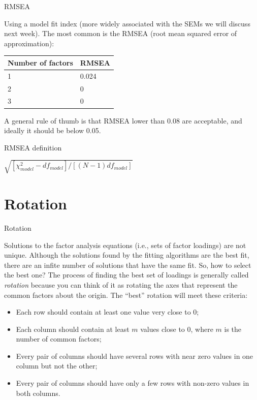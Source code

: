 \documentclass[10pt,ignorenonframetext,]{beamer}
\providecommand{\tightlist}{%
\setlength{\itemsep}{0pt}\setlength{\parskip}{0pt}}
\begin{document}
\begin{frame}{RMSEA}

Using a model fit index (more widely associated with the SEMs we will
discuss next week). The most common is the RMSEA (root mean squared
error of approximation):

\begin{longtable}[]{@{}ll@{}}
\toprule
Number of factors & RMSEA\tabularnewline
\midrule
\endhead
1 & 0.024\tabularnewline
2 & 0\tabularnewline
3 & 0\tabularnewline
\bottomrule
\end{longtable}

A general rule of thumb is that RMSEA lower than 0.08 are acceptable,
and ideally it should be below 0.05.

\begin{block}{RMSEA definition}

\(\sqrt{[\chi^2_{model} - df_{model}]/[(N - 1) df_{model}]}\)

\end{block}

\end{frame}

\section{Rotation}\label{rotation}

\begin{frame}{Rotation}

Solutions to the factor analysis equations (i.e., sets of factor
loadings) are not unique. Although the solutions found by the fitting
algorithms are the best fit, there are an infite number of solutions
that have the same fit. So, how to select the best one? The process of
finding the best set of loadings is generally called \emph{rotation}
because you can think of it as rotating the axes that represent the
common factors about the origin. The ``best'' rotation will meet these
criteria:

\begin{itemize}
\tightlist
\item
  Each row should contain at least one value very close to 0;
\item
  Each column should contain at least \(m\) values close to 0, where
  \(m\) is the number of common factors;
\item
  Every pair of columns should have several rows with near zero values
  in one column but not the other;
\item
  Every pair of columns should have only a few rows with non-zero values
  in both columns.
\end{itemize}

\end{frame}
\end{document}
